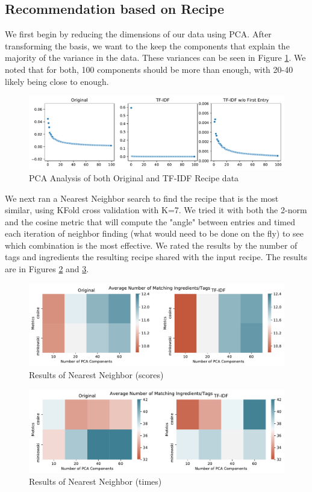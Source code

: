 \documentclass[11pt]{article}
\begin{document}
\subsection{Recommendation based on Recipe}
We first begin by reducing the dimensions of our data using PCA. After transforming the basis, we want to the keep the components that explain the majority of the variance in the data. These variances can be seen in Figure \ref{fig:pca}. We noted that for both, 100 components should be more than enough, with 20-40 likely being close to enough.
\begin{figure}[t]
\centering
\includegraphics[width=1\textwidth]{figs/pca.pdf}
\caption{PCA Analysis of both Original and TF-IDF Recipe data}
\label{fig:pca}
\end{figure}

We next ran a Nearest Neighbor search to find the recipe that is the most similar, using KFold cross validation with K=7. We tried it with both the 2-norm and the cosine metric that will compute the "angle" between entries and timed each iteration of neighbor finding (what would need to be done on the fly) to see which combination is the most effective. We rated the results by the number of tags and ingredients the resulting recipe shared with the input recipe. The results are in Figures \ref{fig:recipe_nn_scores} and \ref{fig:recipe_nn_times}.

\begin{figure}[t]
\centering
\includegraphics[width=1\textwidth]{figs/recipeNN_scores.pdf}
\caption{Results of Nearest Neighbor (scores)}
\label{fig:recipe_nn_scores}
\end{figure}

\begin{figure}[t]
\centering
\includegraphics[width=1\textwidth]{figs/recipeNN_times.pdf}
\caption{Results of Nearest Neighbor (times)}
\label{fig:recipe_nn_times}
\end{figure}
\end{document}
